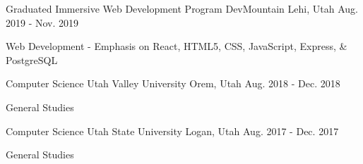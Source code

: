 

\begin{cventries}

  \cventry
    {Graduated Immersive Web Development Program} %
    {DevMountain} %
    {Lehi, Utah} %
    {Aug. 2019 - Nov. 2019} %
    {
      \begin{cvitems} %
        \item {Web Development - Emphasis on React, HTML5, CSS, JavaScript, Express, \& PostgreSQL}
      \end{cvitems}
    }

  \cventry
    {Computer Science} %
    {Utah Valley University} %
    {Orem, Utah} %
    {Aug. 2018 - Dec. 2018} %
    {
      \begin{cvitems} %
        \item {General Studies}
      \end{cvitems}
    }

  \cventry
    {Computer Science} %
    {Utah State University} %
    {Logan, Utah} %
    {Aug. 2017 - Dec. 2017} %
    {
      \begin{cvitems} %
        \item {General Studies}
      \end{cvitems}
    }

\end{cventries}
